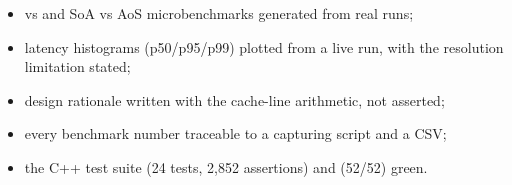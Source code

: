 \begin{itemize}
  \item[\checkmark]  vs  and SoA vs AoS microbenchmarks generated
    from real runs;
  \item[\checkmark] latency histograms (p50/p95/p99) plotted from a live
     run, with the resolution limitation stated;
  \item[\checkmark] design rationale written with the cache-line arithmetic, not asserted;
  \item[\checkmark] every benchmark number traceable to a capturing script and a CSV;
  \item[\checkmark] the C++ test suite (24 tests, 2{,}852 assertions) and 
    (52/52) green.
\end{itemize}
